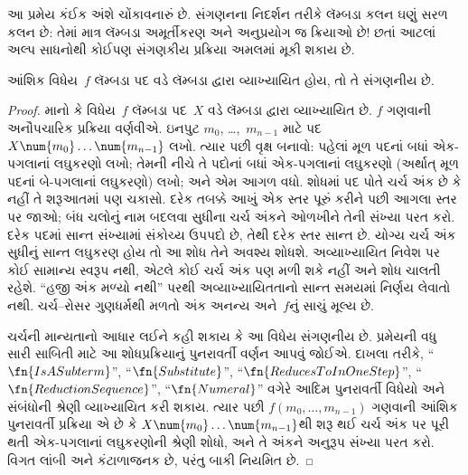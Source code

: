 \begin{explain}
આ પ્રમેય કંઈક અંશે ચોંકાવનારું છે. સંગણનના નિદર્શન તરીકે
લૅમ્બડા કલન ઘણું સરળ કલન છે: તેમાં માત્ર લૅમ્બડા અમૂર્તીકરણ અને
અનુપ્રયોગ જ ક્રિયાઓ છે!{} છતાં આટલાં અલ્પ સાધનોથી કોઈપણ
સંગણકીય પ્રક્રિયા અમલમાં મૂકી શકાય છે.
\end{explain}
\endgroup


\begingroup
\makeatletter{}\makeatother

\label{guunit:OLP-0349}


\begin{thm}
આંશિક વિધેય~$f$ લૅમ્બડા પદ વડે લૅમ્બડા દ્વારા વ્યાખ્યાયિત હોય, તો તે
સંગણનીય છે.
\end{thm}

\begin{proof}
માનો કે વિધેય~$f$ લૅમ્બડા પદ~$X$ વડે લૅમ્બડા દ્વારા વ્યાખ્યાયિત છે.
$f$ ગણવાની અનૌપચારિક પ્રક્રિયા વર્ણવીએ. ઇનપુટ $m_0$,
\dots,~$m_{n-1}$ માટે પદ $X \num{m_0} \ldots \num{m_{n-1}}$
લખો. ત્યાર પછી વૃક્ષ બનાવો: પહેલાં મૂળ પદનાં બધાં એક-પગલાનાં
લઘુકરણો લખો; તેમની નીચે તે પદોનાં બધાં એક-પગલાનાં લઘુકરણો
(અર્થાત્ મૂળ પદનાં બે-પગલાનાં લઘુકરણો) લખો; અને એમ આગળ વધો.
શોધમાં પદ પોતે ચર્ચ અંક છે કે નહીં તે શરૂઆતમાં પણ ચકાસો.
દરેક તબક્કે આખું એક સ્તર પૂરું કરીને પછી આગલા સ્તર પર જાઓ;
બંધ ચલોનું નામ બદલવા સુધીના ચર્ચ અંકને ઓળખીને તેની સંખ્યા પરત કરો.
દરેક પદમાં સાન્ત સંખ્યામાં સંકોચ્ય ઉપપદો છે, તેથી દરેક સ્તર સાન્ત છે.
યોગ્ય ચર્ચ અંક સુધીનું સાન્ત લઘુકરણ હોય તો આ શોધ તેને અવશ્ય શોધશે.
અવ્યાખ્યાયિત નિવેશ પર કોઈ સામાન્ય સ્વરૂપ નથી, એટલે કોઈ ચર્ચ અંક પણ
મળી શકે નહીં અને શોધ ચાલતી રહેશે. ``હજી અંક મળ્યો નથી'' પરથી
અવ્યાખ્યાયિતતાનો સાન્ત સમયમાં નિર્ણય લેવાતો નથી.
ચર્ચ--રોસર ગુણધર્મથી મળતો અંક અનન્ય અને~$f$નું સાચું મૂલ્ય છે.

ચર્ચની માન્યતાનો આધાર લઈને કહી શકાય કે આ વિધેય સંગણનીય છે.
પ્રમેયની વધુ સારી સાબિતી માટે આ શોધપ્રક્રિયાનું પુનરાવર્તી વર્ણન
આપવું જોઈએ. દાખલા તરીકે,
``$\fn{IsASubterm}$'', ``$\fn{Substitute}$'',
``$\fn{ReducesToInOneStep}$'', ``$\fn{ReductionSequence}$'',
``$\fn{Numeral}$'' વગેરે આદિમ પુનરાવર્તી વિધેયો અને સંબંધોની
શ્રેણી વ્યાખ્યાયિત કરી શકાય. ત્યાર પછી $f(m_0, \dots, m_{n-1})$
ગણવાની આંશિક પુનરાવર્તી પ્રક્રિયા એ છે કે
$X \num{m_0} \dots \num{m_{n-1}}$થી શરૂ થઈ ચર્ચ અંક પર પૂરી થતી
એક-પગલાનાં લઘુકરણોની શ્રેણી શોધો, અને તે અંકને અનુરૂપ સંખ્યા
પરત કરો. વિગત લાંબી અને કંટાળાજનક છે, પરંતુ બાકી નિયમિત છે.
\end{proof}
\endgroup


